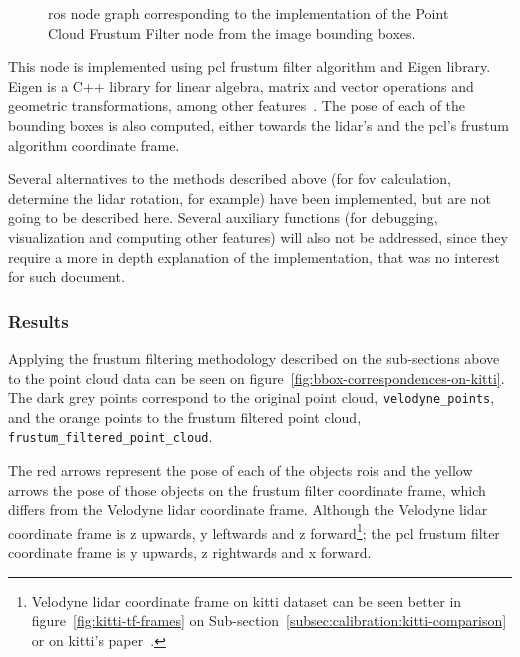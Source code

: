 \begin{figure}[t]
	\centering
	\def\svgwidth{\columnwidth}
	\graphicspath{{img/image-object-to-point-cloud/}}
	
	\caption{\ac{ros} node graph corresponding to the implementation of the Point Cloud Frustum Filter node from the image bounding boxes.}
	\label{fig:ros-graph-frustum}
\end{figure}


This node is implemented using \ac{pcl} frustum filter algorithm and Eigen library. Eigen is a C++ library for linear algebra, matrix and vector operations and geometric transformations, among other features~\cite{Eigenv3}. The pose of each of the bounding boxes is also computed, either towards the \ac{lidar}'s and the \ac{pcl}'s frustum algorithm coordinate frame. 

Several alternatives to the methods described above (for \ac{fov} calculation, determine the \ac{lidar} rotation, for example) have been implemented, but are not going to be described here. Several auxiliary functions (for debugging, visualization and computing other features) will also not be addressed, since they require a more in depth explanation of the implementation, that was no interest for such document. 


\subsubsection{Results}
Applying the frustum filtering methodology described on the sub-sections above to the point cloud data can be seen on figure~\ref{fig:bbox-correspondences-on-kitti}. The dark grey points correspond to the original point cloud, \texttt{velodyne\_points}, and the orange points to the frustum filtered point cloud, \texttt{frustum\_filtered\_point\_cloud}.

The red arrows represent the pose of each of the objects \acp{roi} and the yellow arrows the pose of those objects on the frustum filter coordinate frame, which differs from the Velodyne \ac{lidar} coordinate frame. Although the Velodyne \ac{lidar} coordinate frame is z upwards, y leftwards and z forward\footnote{Velodyne \ac{lidar} coordinate frame on \ac{kitti} dataset can be seen better in figure~\ref{fig:kitti-tf-frames} on Sub-section~\ref{subsec:calibration:kitti-comparison} or on \ac{kitti}'s paper~\cite{Geiger2013a}.}; the \ac{pcl} frustum filter coordinate frame is y upwards, z rightwards and x forward.

